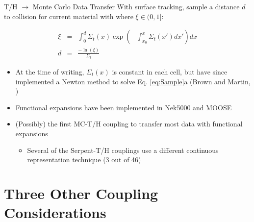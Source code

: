 \documentclass[10pt]{beamer}
\begin{document}
\begin{frame}{T/H \(\rightarrow\) Monte Carlo Data Transfer}
With surface tracking, sample a distance \(d\) to collision for current material with where \(\xi\in(0,1]\):

\begin{subequations}
\label{eq:Sample}
\begin{eqnarray}
\xi&=&\int_0^d\Sigma_t(x)\exp{\left(-\int_{x_0}^x\Sigma_t(x')dx'\right)}dx\\
d&=&\frac{-\ln{(\xi)}}{\Sigma_t}
\end{eqnarray}
\end{subequations}

\vspace{0.25cm}
\begin{itemize}
\item At the time of writing, \(\Sigma_t(x)\) is constant in each cell, but have since implemented a Newton method to solve Eq. \eqref{eq:Sample}a (Brown and Martin, \cite{brown_martin_direct})
\item Functional expansions have been implemented in Nek5000 and MOOSE
\item (Possibly) the first MC-T/H coupling to transfer most data with functional expansions
	\begin{itemize}
	\item Several of the Serpent-T/H couplings use a different continuous representation technique (3 out of 46)
	\end{itemize}
\end{itemize}
\end{frame}

\section{Three Other Coupling Considerations}
\end{document}
